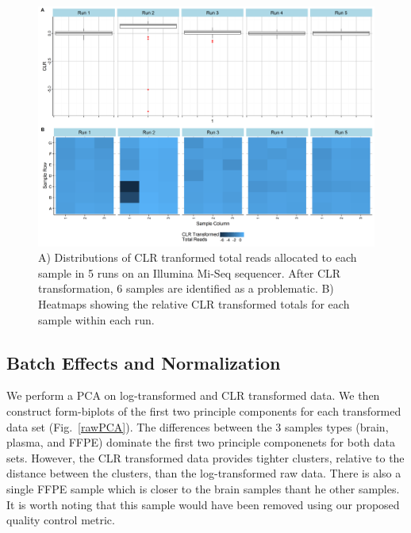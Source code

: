 \documentclass{article}\usepackage[]{graphicx}\usepackage[]{color}
\theoremstyle{definition}
\begin{document}
\begin{figure}
\includegraphics[scale=.5]{./Figures/IO_Repro_Combined_CLR}
\caption{A) Distributions of CLR tranformed total reads allocated to each sample in 5 runs on an Illumina Mi-Seq sequencer. After CLR transformation, 6 samples are identified as a problematic. B) Heatmaps showing the relative CLR transformed totals for each sample within each run.}
\label{clrFig}
\end{figure}

\subsection{Batch Effects and Normalization}

We perform a PCA on log-transformed and CLR transformed data.  We then construct form-biplots of the first two principle components for each transformed data set (Fig.~\ref{rawPCA}).  The differences between the 3 samples types (brain, plasma, and FFPE) dominate the first two principle componenets for both data sets.  However, the CLR transformed data provides tighter clusters, relative to the distance between the clusters, than the log-transformed raw data.  There is also a single FFPE sample which is closer to the brain samples thant he other samples.  It is worth noting that this sample would have been removed using our proposed quality control metric.\\
\end{document}
